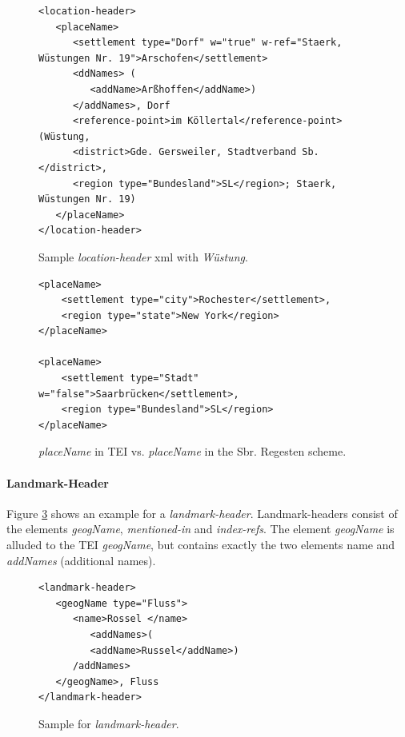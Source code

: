 \begin{figure}[H]
\begin{verbatim}
<location-header>
   <placeName>
      <settlement type="Dorf" w="true" w-ref="Staerk, Wüstungen Nr. 19">Arschofen</settlement>
      <ddNames> (
         <addName>Arßhoffen</addName>)
      </addNames>, Dorf 
      <reference-point>im Köllertal</reference-point> (Wüstung, 
      <district>Gde. Gersweiler, Stadtverband Sb.</district>, 
      <region type="Bundesland">SL</region>; Staerk, Wüstungen Nr. 19) 
   </placeName>
</location-header>
\end{verbatim}
\label{fig:location-wuest-xml}
\caption{Sample \textit{location-header} xml with \textit{Wüstung}.}
\end{figure}

\begin{figure}[H]
\begin{verbatim}
<placeName>
    <settlement type="city">Rochester</settlement>,
    <region type="state">New York</region>
</placeName>

<placeName>
    <settlement type="Stadt" w="false">Saarbrücken</settlement>,
    <region type="Bundesland">SL</region>
</placeName>
\end{verbatim}
\label{fig:placeName}
\caption{\textit{placeName} in TEI vs. \textit{placeName} in the Sbr. Regesten scheme.}
\end{figure}


\paragraph{Landmark-Header}
Figure \ref{fig:landmark-header-xml} shows an example for a \textit{landmark-header}. Landmark-headers consist of the elements \textit{geogName}, \textit{mentioned-in} and \textit{index-refs}. The element \textit{geogName} is alluded to the TEI \textit{geogName}, but contains exactly the two elements name and \textit{addNames} (additional names).

\begin{figure}[H]
\begin{verbatim}
<landmark-header>
   <geogName type="Fluss">
      <name>Rossel </name>
         <addNames>(
         <addName>Russel</addName>)
      /addNames>
   </geogName>, Fluss 
</landmark-header>
\end{verbatim}
\label{fig:landmark-header-xml}
\caption{Sample for \textit{landmark-header}.}
\end{figure}

